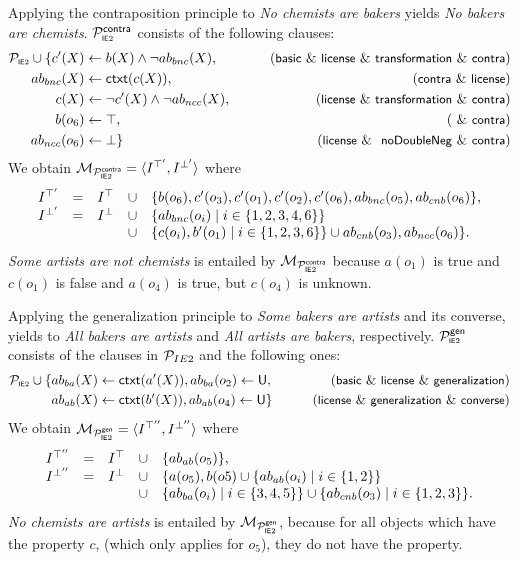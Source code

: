 \documentclass[12pt]{article}
\begin{document}
Applying the contraposition principle to \textit{No chemists are bakers} yields \textit{No bakers are chemists}.
${{\cal P}^{\tiny {\small\textsf{contra}}}_{\tiny\mbox{\textsf{I}\textsf{E}2}}}$ consists of the following clauses:
\begin{align*}
\Pie \cup \{ c'(X) & \leftarrow b(X) \wedge \neg \Ab_{bnc}(X), & \tag{\basic\ \&\ \licenses\ \&\ \transformation\  \&\  \contraposition} \\
\Ab_{bnc}(X) & \leftarrow \cxt(c(X)), & \tag{\contraposition\  \&\ \licenses} \\
c(X) & \leftarrow \neg c'(X) \wedge \neg \Ab_{ncc}(X), &  \tag{\licenses\ \&\ \transformation\  \&\  \contraposition} \\
b(o_6) & \leftarrow \top, & \tag{\ \&\ \contraposition} \\
\Ab_{ncc}(o_6) & \leftarrow \bot  \} & \tag{\licenses\ \& \ \dnegation\ \&\ \contraposition}
\end{align*}
We obtain ${\cal M}_{{{\cal P}^{\tiny {\small\textsf{contra}}}_{\tiny\mbox{\textsf{I}\textsf{E}2}}}} = \langle I^{\top'}, I^{\bot'} \rangle$ where 
\[
\begin{array}{lllll}
 I^{\top'} & = & I^\top & \cup & \{ b(o_6), c'(o_3), c'(o_1), c'(o_2), c'(o_6), ab_{bnc}(o_5), ab_{cnb}(o_6) \}, \\
I^{\bot'} & =  & I^\bot  & \cup & \{  ab_{bnc}(o_i) \mid i \in \{1,2,3,4,6 \} \} 
\\ &&& \cup  &
\{ c(o_i), b'(o_1) \mid i \in \{ 1, 2, 3, 6 \} \} \cup ab_{cnb}(o_3), ab_{ncc}(o_6) \}.
\end{array}
\]
\textit{Some artists are not chemists} is entailed by ${\cal M}_{{{\cal P}^{\tiny {\small\textsf{contra}}}_{\tiny\mbox{\textsf{I}\textsf{E}2}}}}$ because 
$a(o_1)$ is true and $c(o_1)$ is false and $a(o_4)$ is true, but $c(o_4)$ is unknown.

Applying the generalization principle to \textit{Some bakers are artists} and its converse,
yields to \textit{All bakers are artists} and \textit{All artists are bakers}, respectively.
${{\cal P}^{\tiny {\small\textsf{gen}}}_{\tiny\mbox{\textsf{I}\textsf{E}2}}}$ consists of the clauses in ${\cal P}_{IE2}$ and the following ones:
\begin{align}
\Pie \cup \{  \Ab_{ba}(X) & \leftarrow \cxt(a'(X)),  \Ab_{ba}(o_2) \leftarrow \udf, & \tag{\basic\ \&\ \licenses\ \&\ \negFailure} \\
  \Ab_{ab}(X) & \leftarrow \cxt(b'(X)),   \Ab_{ab}(o_4) \leftarrow \udf \}  & \tag{\licenses\ \&\ \negFailure\ \&\ \converse}
\end{align}
We obtain ${\cal M}_{{{\cal P}^{\tiny {\small\textsf{gen}}}_{\tiny\mbox{\textsf{I}\textsf{E}2}}}}  = \langle I^{\top''}, I^{\bot''} \rangle$ where 
\[
\begin{array}{lllll}
 I^{\top''} & = & I^\top & \cup & \{ab_{ab}(o_5)  \}, \\
I^{\bot''} & = & I^\bot & \cup & \{ a(o_5),  b(o5) \cup \{ ab_{ab}(o_i) \mid i \in \{ 1,2\}\} \\
& & & \cup &
\{ ab_{ba}(o_i) \mid i \in \{3, 4, 5 \} \} \cup \{ ab_{cnb}(o_3) \mid i \in \{1,2,3 \} \}.
\end{array}
\]
\textit{No chemists are artists} is entailed by ${\cal M}_{{{\cal P}^{\tiny {\small\textsf{gen}}}_{\tiny\mbox{\textsf{I}\textsf{E}2}}}}$, because 
for all objects which have the property $c$, (which only applies for $o_5$), they do not have the property.
\end{document}
